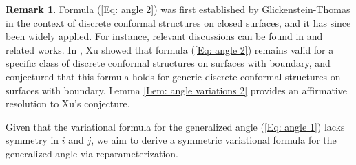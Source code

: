 \documentclass[12pt]{amsart}
\theoremstyle{definition}
\newtheorem{remark}[theorem]{Remark}
\begin{document}
\begin{remark}
Formula (\ref{Eq: angle 2}) was first established by Glickenstein-Thomas \cite{GT} in the context of discrete conformal structures on closed surfaces, and it has since been widely applied.
For instance, relevant discussions can be found in \cite{Xu21, Xu 21a, Xu 21b, XZ22} and related works. 
In \cite{Xu22}, Xu showed that formula (\ref{Eq: angle 2}) remains valid for a specific class of discrete conformal structures on surfaces with boundary, and conjectured that this formula holds for generic discrete conformal structures on surfaces with boundary. 
Lemma \ref{Lem: angle variations 2} provides an affirmative resolution to Xu's conjecture.
\end{remark}

Given that the variational formula for the generalized angle (\ref{Eq: angle 1}) lacks symmetry in $i$ and $j$, we aim to derive a symmetric variational formula for the generalized angle via reparameterization.
\end{document}
